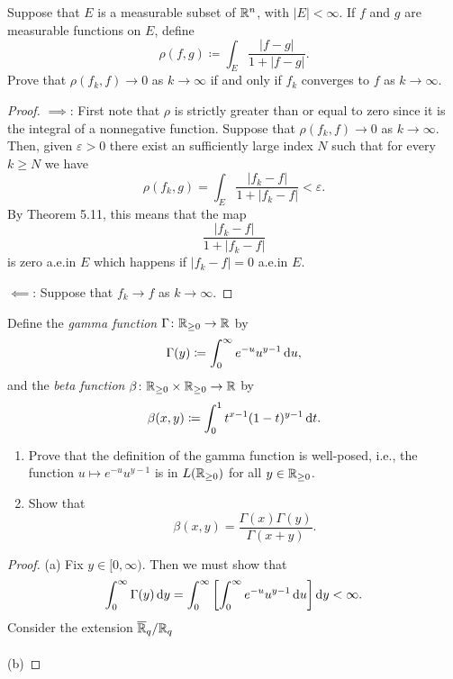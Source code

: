 \begin{problem}
Suppose that $E$ is a measurable subset of $\mathbb{R}^n$, with
$|E|<\infty$. If $f$ and $g$ are measurable functions on
$E$, define
\[
\rho(f,g)\coloneqq\int_E\frac{|f-g|}{1+|f-g|}.
\]
Prove that $\rho(f_k,f)\to 0$ as $k\to\infty$ if and only if $f_k$
converges to $f$ as $k\to\infty$.
\end{problem}
\begin{proof}
$\implies$: First note that $\rho$ is strictly greater than or equal to
zero since it is the integral of a nonnegative function. Suppose that
$\rho(f_k,f)\to 0$ as $k\to\infty$. Then, given $\varepsilon>0$ there exist
an sufficiently large index $N$ such that for every $k\geq N$ we have
\begin{equation}
\label{eq:hypothesis-4}
\rho(f_k,g)=\int_E\frac{|f_k-f|}{1+|f_k-f|}<\varepsilon.
\end{equation}
By Theorem 5.11, this means that the map
\[
\frac{|f_k-f|}{1+|f_k-f|}
\]
is zero a.e.\@ in $E$ which happens if $|f_k-f|=0$ a.e.\@ in $E$.

$\impliedby$: Suppose that $f_k\to f$ as $k\to\infty$.
\end{proof}

\begin{problem}
Define the \emph{gamma function} $\Gamma\colon\mathbb{R}_{\geq 0}\to\mathbb{R}$ by
\[
\Gamma(y)\coloneqq\int_0^\infty e^{-u}u^{y-1}\mathop{}\!\mathrm{d} u,
\]
and the \emph{beta function} $\beta\colon\mathbb{R}_{\geq 0}\times\mathbb{R}_{\geq 0}\to\mathbb{R}$
by
\[
\beta(x,y)\coloneqq\int_0^1 t^{x-1}(1-t)^{y-1}\mathop{}\!\mathrm{d} t.
\]
\begin{enumerate}[label=(\alph*)]
\item Prove that the definition of the gamma function is well-posed, i.e.,
the function $u\mapsto e^{-u}u^{y-1}$ is in $L(\mathbb{R}_{\geq 0})$ for all
$y\in\mathbb{R}_{\geq 0}$.
\item Show that
\[
\beta(x,y)=\frac{\Gamma(x)\Gamma(y)}{\Gamma(x+y)}.
\]
\end{enumerate}
\end{problem}
\begin{proof}
(a) Fix $y\in[0,\infty)$. Then we must show that
\begin{equation}
\label{eq:desired-inequality-5}
\int_0^\infty\Gamma(y)\mathop{}\!\mathrm{d} y=\int_0^\infty\left[\int_0^\infty
  e^{-u}u^{y-1}\mathop{}\!\mathrm{d} u\right]\mathop{}\!\mathrm{d} y<\infty.
\end{equation}
Consider the extension $\overline{\mathbb{R}}_q/\mathbb{R}_q$
\\\\
(b)
\end{proof}

